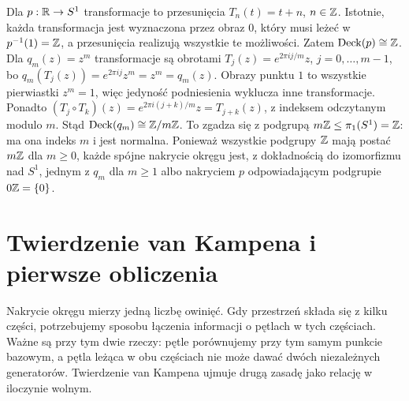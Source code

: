 \begin{przyklad}
Dla $p:\mathbb{R}\to S^1$ transformacje to przesunięcia
$T_n(t)=t+n$, $n\in\mathbb{Z}$. Istotnie, każda transformacja
jest wyznaczona przez obraz $0$, który musi leżeć
w $p^{-1}(1)=\mathbb{Z}$, a przesunięcia realizują wszystkie
te możliwości. Zatem $\operatorname{Deck}(p)\cong\mathbb{Z}$.
Dla $q_m(z)=z^m$ transformacje są obrotami
$T_j(z)=e^{2\pi i j/m}z$, $j=0,\ldots,m-1$,
bo $q_m(T_j(z))=e^{2\pi ij}z^m=z^m=q_m(z)$.
Obrazy punktu $1$ to wszystkie pierwiastki $z^m=1$,
więc jedyność podniesienia wyklucza inne transformacje.
Ponadto $(T_j\circ T_k)(z)=e^{2\pi i(j+k)/m}z=T_{j+k}(z)$,
z indeksem odczytanym modulo $m$.
Stąd $\operatorname{Deck}(q_m)\cong\mathbb{Z}/m\mathbb{Z}$.
To zgadza się z podgrupą $m\mathbb{Z}\leq\pi_1(S^1)=\mathbb{Z}$:
ma ona indeks $m$ i jest normalna. Ponieważ wszystkie
podgrupy $\mathbb{Z}$ mają postać $m\mathbb{Z}$ dla $m\geq0$,
każde spójne nakrycie okręgu jest, z dokładnością
do izomorfizmu nad $S^1$, jednym z $q_m$ dla $m\geq1$
albo nakryciem $p$ odpowiadającym podgrupie $0\mathbb{Z}=\{0\}$.
\end{przyklad}

\section{Twierdzenie van Kampena i pierwsze obliczenia}
\label{sec:van-kampen}

Nakrycie okręgu mierzy jedną liczbę owinięć.
Gdy przestrzeń składa się z kilku części,
potrzebujemy sposobu łączenia informacji
o pętlach w tych częściach.
Ważne są przy tym dwie rzeczy: pętle porównujemy
przy tym samym punkcie bazowym, a pętla leżąca
w obu częściach nie może dawać dwóch niezależnych
generatorów. Twierdzenie van Kampena ujmuje
drugą zasadę jako relację w iloczynie wolnym.

